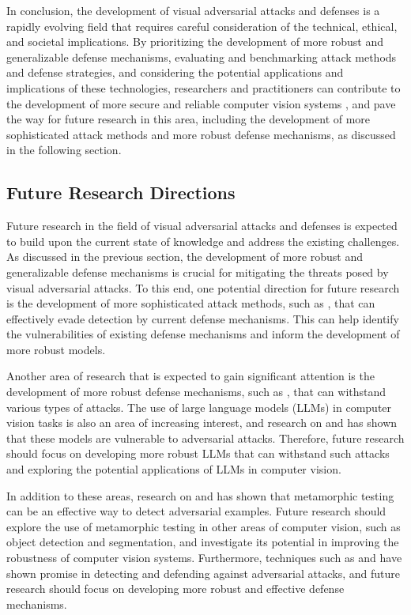 \documentclass[11pt]{article}
\begin{document}
In conclusion, the development of visual adversarial attacks and defenses is a rapidly evolving field that requires careful consideration of the technical, ethical, and societal implications. By prioritizing the development of more robust and generalizable defense mechanisms, evaluating and benchmarking attack methods and defense strategies, and considering the potential applications and implications of these technologies, researchers and practitioners can contribute to the development of more secure and reliable computer vision systems \cite{ref90}, and pave the way for future research in this area, including the development of more sophisticated attack methods and more robust defense mechanisms, as discussed in the following section.

\subsection{Future Research Directions}

Future research in the field of visual adversarial attacks and defenses is expected to build upon the current state of knowledge and address the existing challenges. As discussed in the previous section, the development of more robust and generalizable defense mechanisms is crucial for mitigating the threats posed by visual adversarial attacks. To this end, one potential direction for future research is the development of more sophisticated attack methods, such as \cite{ref177}, that can effectively evade detection by current defense mechanisms. This can help identify the vulnerabilities of existing defense mechanisms and inform the development of more robust models.

Another area of research that is expected to gain significant attention is the development of more robust defense mechanisms, such as \cite{ref13}, that can withstand various types of attacks. The use of large language models (LLMs) in computer vision tasks is also an area of increasing interest, and research on \cite{ref128} and \cite{ref178} has shown that these models are vulnerable to adversarial attacks. Therefore, future research should focus on developing more robust LLMs that can withstand such attacks and exploring the potential applications of LLMs in computer vision.

In addition to these areas, research on \cite{ref179} and \cite{ref180} has shown that metamorphic testing can be an effective way to detect adversarial examples. Future research should explore the use of metamorphic testing in other areas of computer vision, such as object detection and segmentation, and investigate its potential in improving the robustness of computer vision systems. Furthermore, techniques such as \cite{ref181} and \cite{ref182} have shown promise in detecting and defending against adversarial attacks, and future research should focus on developing more robust and effective defense mechanisms.
\end{document}

